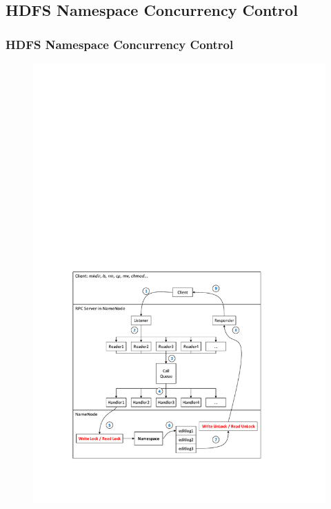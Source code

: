\documentclass{beamer}
\begin{document}
\subsection{HDFS Namespace Concurrency Control}
\begin{frame}
	\frametitle{HDFS Namespace Concurrency Control}
		\begin{figure}[h]
			\centering
			\includegraphics[scale=0.4]{figs/nnRPC.pdf}
		\end{figure}
\end{frame}
\end{document}
